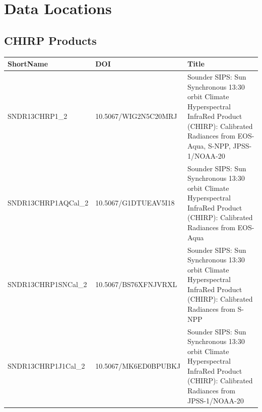 \documentclass[11pt]{article}
\begin{document}
\section{Data Locations}
\subsection{CHIRP Products}
{\footnotesize
\begin{center}
\begin{tabular}{|m{3.7cm}|m{4cm}|m{7.3cm}| }
  \hline
  ShortName & DOI & Title \\
  \hline\hline
  SNDR13CHRP1\_2 & 10.5067/WIG2N5C20MRJ & Sounder SIPS: Sun
  Synchronous 13:30 orbit Climate Hyperspectral InfraRed Product
  (CHIRP): Calibrated Radiances from EOS-Aqua, S-NPP, JPSS-1/NOAA-20 \\
  \hline
  SNDR13CHRP1AQCal\_2 & 10.5067/G1DTUEAV5I18 & Sounder SIPS: Sun
  Synchronous 13:30 orbit Climate Hyperspectral InfraRed Product
  (CHIRP): Calibrated Radiances from EOS-Aqua \\
  \hline
  SNDR13CHRP1SNCal\_2 & 10.5067/BS76XFNJVRXL & Sounder SIPS: Sun
  Synchronous 13:30 orbit Climate Hyperspectral InfraRed Product
  (CHIRP): Calibrated Radiances from S-NPP \\
  \hline
  SNDR13CHRP1J1Cal\_2 & 10.5067/MK6ED0BPUBKJ & Sounder SIPS: Sun
  Synchronous 13:30 orbit Climate Hyperspectral InfraRed Product
  (CHIRP): Calibrated Radiances from JPSS-1/NOAA-20 \\
  \hline
\end{tabular}
\end{center}
}
\end{document}

